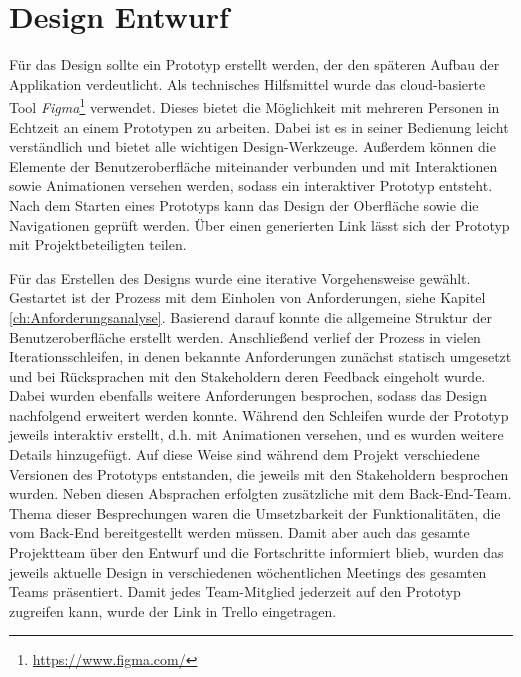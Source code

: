 \section{Design Entwurf}\label{ch:DesignEntwurf}
Für das Design sollte ein Prototyp erstellt werden, der den späteren Aufbau der Applikation verdeutlicht.
Als technisches Hilfsmittel wurde das cloud-basierte Tool \textit{Figma}\footnote{\url{https://www.figma.com/}} verwendet.
Dieses bietet die Möglichkeit mit mehreren Personen in Echtzeit an einem Prototypen zu arbeiten.
Dabei ist es in seiner Bedienung leicht verständlich und bietet alle wichtigen Design-Werkzeuge. 
Außerdem können die Elemente der Benutzeroberfläche miteinander verbunden und mit Interaktionen sowie Animationen versehen werden, sodass ein interaktiver Prototyp entsteht.
Nach dem Starten eines Prototyps kann das Design der Oberfläche sowie die Navigationen geprüft werden.
Über einen generierten Link lässt sich der Prototyp mit Projektbeteiligten teilen. 

Für das Erstellen des Designs wurde eine iterative Vorgehensweise gewählt.  
Gestartet ist der Prozess mit dem Einholen von Anforderungen, siehe Kapitel \ref{ch:Anforderungsanalyse}.
Basierend darauf konnte die allgemeine Struktur der Benutzeroberfläche erstellt werden.
Anschließend verlief der Prozess in vielen Iterationsschleifen, in denen bekannte Anforderungen zunächst statisch umgesetzt und bei Rücksprachen mit den Stakeholdern deren Feedback eingeholt wurde.
Dabei wurden ebenfalls weitere Anforderungen besprochen, sodass das Design nachfolgend erweitert werden konnte.
Während den Schleifen wurde der Prototyp jeweils interaktiv erstellt, d.h. mit Animationen versehen, und es wurden weitere Details hinzugefügt.
Auf diese Weise sind während dem Projekt verschiedene Versionen des Prototyps entstanden, die jeweils mit den Stakeholdern besprochen wurden.
Neben diesen Absprachen erfolgten zusätzliche mit dem Back-End-Team.
Thema dieser Besprechungen waren die Umsetzbarkeit der Funktionalitäten, die vom Back-End bereitgestellt werden müssen.
Damit aber auch das gesamte Projektteam über den Entwurf und die Fortschritte informiert blieb, wurden das jeweils aktuelle Design in verschiedenen wöchentlichen Meetings des gesamten Teams präsentiert.
Damit jedes Team-Mitglied jederzeit auf den Prototyp zugreifen kann, wurde der Link in Trello eingetragen. 

